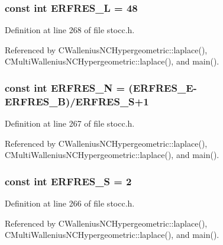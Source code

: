\subsubsection[{E\-R\-F\-R\-E\-S\-\_\-\-L}]{\setlength{\rightskip}{0pt plus 5cm}const int E\-R\-F\-R\-E\-S\-\_\-\-L = 48\hspace{0.3cm}{\ttfamily [static]}}\label{rnd_2stocc_8h_a628049f07f497de2031e3c9611221083}


Definition at line 268 of file stocc.\-h.



Referenced by C\-Wallenius\-N\-C\-Hypergeometric\-::laplace(), C\-Multi\-Wallenius\-N\-C\-Hypergeometric\-::laplace(), and main().

\subsubsection[{E\-R\-F\-R\-E\-S\-\_\-\-N}]{\setlength{\rightskip}{0pt plus 5cm}const int E\-R\-F\-R\-E\-S\-\_\-\-N = ({\bf E\-R\-F\-R\-E\-S\-\_\-\-E}-\/{\bf E\-R\-F\-R\-E\-S\-\_\-\-B})/{\bf E\-R\-F\-R\-E\-S\-\_\-\-S}+1\hspace{0.3cm}{\ttfamily [static]}}\label{rnd_2stocc_8h_a384024d60d6dadea524477459ed635be}


Definition at line 267 of file stocc.\-h.



Referenced by C\-Wallenius\-N\-C\-Hypergeometric\-::laplace(), C\-Multi\-Wallenius\-N\-C\-Hypergeometric\-::laplace(), and main().

\subsubsection[{E\-R\-F\-R\-E\-S\-\_\-\-S}]{\setlength{\rightskip}{0pt plus 5cm}const int E\-R\-F\-R\-E\-S\-\_\-\-S = 2\hspace{0.3cm}{\ttfamily [static]}}\label{rnd_2stocc_8h_a9ca2af6f4bf433ea1a00fcccd447ef35}


Definition at line 266 of file stocc.\-h.



Referenced by C\-Wallenius\-N\-C\-Hypergeometric\-::laplace(), C\-Multi\-Wallenius\-N\-C\-Hypergeometric\-::laplace(), and main().

